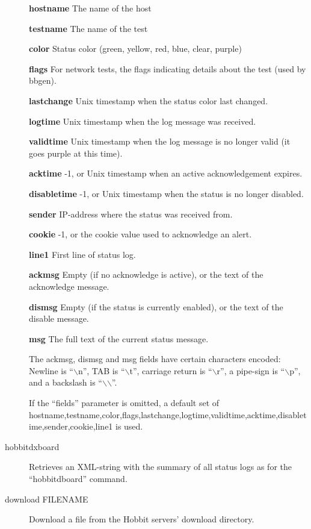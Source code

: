 \begin{description}
 \textbf{hostname}
 The name of the host 


 \textbf{testname}
 The name of the test 


 \textbf{color}
 Status color (green, yellow, red, blue, clear, purple) 


 \textbf{flags}
 For network tests, the flags indicating details about the test (used by bbgen). 


 \textbf{lastchange}
 Unix timestamp when the status color last changed. 


 \textbf{logtime}
 Unix timestamp when the log message was received. 


 \textbf{validtime}
 Unix timestamp when the log message is no longer valid (it goes purple at this time). 


 \textbf{acktime}
 -1, or Unix timestamp when an active acknowledgement expires. 


 \textbf{disabletime}
 -1, or Unix timestamp when the status is no longer disabled. 


 \textbf{sender}
 IP-address where the status was received from. 


 \textbf{cookie}
 -1, or the cookie value used to acknowledge an alert. 


 \textbf{line1}
 First line of status log. 


 \textbf{ackmsg}
 Empty (if no acknowledge is active), or the text of the acknowledge message. 


 \textbf{dismsg}
 Empty (if the status is currently enabled), or the text of the disable message. 


 \textbf{msg}
 The full text of the current status message. 

  The ackmsg, dismsg and msg fields have certain characters encoded:
  Newline is ``$\backslash$n'', TAB is ``$\backslash$t'', carriage
  return is ``$\backslash$r'', a pipe-sign is ``$\backslash$p'', and a
  backslash is ``$\backslash$$\backslash$''. 



  If the ``fields'' parameter is omitted, a default set of
  hostname,testname,color,flags,lastchange,logtime,validtime,acktime,disabletime,sender,cookie,line1
  is used. 

\item[hobbitdxboard] Retrieves an XML-string with the summary of all
  status logs as for the ``hobbitdboard'' command. 



 

\item[download FILENAME] Download a file from the Hobbit servers' download directory. 


\end{description}
